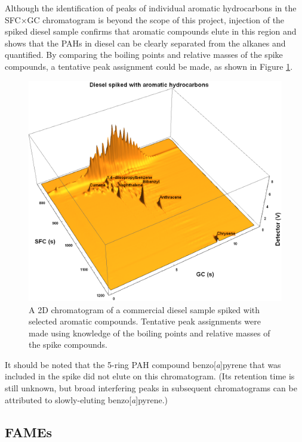 Although the identification of peaks of individual aromatic hydrocarbons in the
SFC×GC chromatogram is beyond the scope of this project, injection of the spiked
diesel sample confirms that aromatic compounds elute in this region and shows
that the PAHs in diesel can be clearly separated from the alkanes and
quantified. By comparing the boiling points and relative masses of the spike
compounds, a tentative peak assignment could be made, as shown in Figure
\ref{fig:Spiked_Diesel_Annotated}.

\begin{figure}
	\centering
	\includegraphics[width=\textwidth]{Figures/Spiked_Diesel_Annotated.png}
	\decoRule	
	
\caption[Peak assignment in spiked diesel sample.]{A 2D chromatogram of a
commercial diesel sample spiked with selected aromatic compounds. Tentative peak
assignments were made using knowledge of the boiling points and relative masses
of the spike compounds.}

	\label{fig:Spiked_Diesel_Annotated} 
\end{figure}

It should be noted that the 5-ring PAH compound benzo[\textit{a}]pyrene that was
included in the spike did not elute on this chromatogram. (Its retention time is
still unknown, but broad interfering peaks in subsequent chromatograms can be
attributed to slowly-eluting benzo[\textit{a}]pyrene.)

\subsection{FAMEs}

